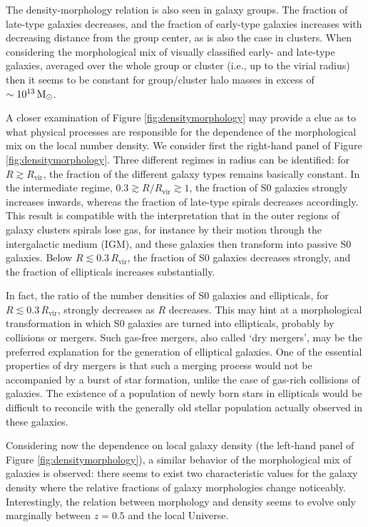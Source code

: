 \documentclass[a4paper,11pt]{article}
\begin{document}
{\noindent}The density-morphology relation is also seen in galaxy groups. The fraction of late-type galaxies decreases, and the fraction of early-type galaxies increases with decreasing distance from the group center, as is also the case in clusters. When considering the morphological mix of visually classified early- and late-type galaxies, averaged over the whole group or cluster (i.e., up to the virial radius) then it seems to be constant for group/cluster halo masses in excess of $\sim10^{13}\,{\rm M_\odot}$.

{\noindent}A closer examination of Figure \ref{fig:densitymorphology} may provide a clue as to what physical processes are responsible for the dependence of the morphological mix on the local number density. We consider first the right-hand panel of Figure \ref{fig:densitymorphology}. Three different regimes in radius can be identified: for $R\gtrsim R_\mathrm{vir}$, the fraction of the different galaxy types remains basically constant. In the intermediate regime, $0.3\gtrsim R/R_\mathrm{vir}\gtrsim1$, the fraction of S0 galaxies strongly increases inwards, whereas the fraction of late-type spirals decreases accordingly. This result is compatible with the interpretation that in the outer regions of galaxy clusters spirals lose gas, for instance by their motion through the intergalactic medium (IGM), and these galaxies then transform into passive S0 galaxies. Below $R\lesssim0.3\,R_\mathrm{vir}$, the fraction of S0 galaxies decreases strongly, and the fraction of ellipticals increases substantially.

{\noindent}In fact, the ratio of the number densities of S0 galaxies and ellipticals, for $R\lesssim0.3\,R_\mathrm{vir}$, strongly decreases as $R$ decreases. This may hint at a morphological transformation in which S0 galaxies are turned into ellipticals, probably by collisions or mergers. Such gas-free mergers, also called `dry mergers', may be the preferred explanation for the generation of elliptical galaxies. One of the essential properties of dry mergers is that such a merging process would not be accompanied by a burst of star formation, unlike the case of gas-rich collisions of galaxies. The existence of a population of newly born stars in ellipticals would be difficult to reconcile with the generally old stellar population actually observed in these galaxies.

{\noindent}Considering now the dependence on local galaxy density (the left-hand panel of Figure \ref{fig:densitymorphology}), a similar behavior of the morphological mix of galaxies is observed: there seems to exist two characteristic values for the galaxy density where the relative fractions of galaxy morphologies change noticeably. Interestingly, the relation between morphology and density seems to evolve only marginally between $z=0.5$ and the local Universe.
\end{document}
